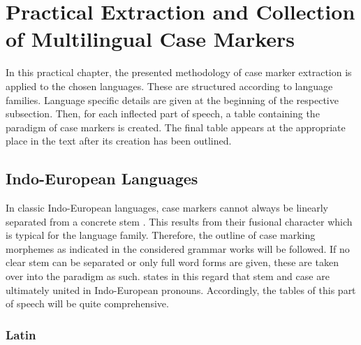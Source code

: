 \documentclass[11pt,a4paper,twoside,openright]{scrbook}
\begin{document}
\chapter{Practical Extraction and Collection of Multilingual Case Markers}

In this practical chapter, the presented methodology of case marker extraction is applied to the chosen languages. These are structured according to language families. Language specific details are given at the beginning of the respective subsection. Then, for each inflected part of speech, a table containing the paradigm of case markers is created. The final table appears at the appropriate place in the text after its creation has been outlined.


\section{Indo-European Languages}

In classic Indo-European languages, case markers cannot always be linearly separated from a concrete stem \citep{blake1994case}. This results from their fusional character which is typical for the language family. Therefore, the outline of case marking morphemes as indicated in the considered grammar works will be followed. If no clear stem can be separated or only full word forms are given, these are taken over into the paradigm as such. \citet{blake1994case} states in this regard that stem and case are ultimately united in Indo-European pronouns. Accordingly, the tables of this part of speech will be quite comprehensive.





\subsection{Latin}
\end{document}
